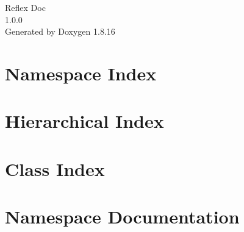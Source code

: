 \let\mypdfximage\pdfximage\def\pdfximage{\immediate\mypdfximage}\documentclass[twoside]{book}
\newcommand{\+}{\discretionary{\mbox{\scriptsize$\hookleftarrow$}}{}{}}
\newcommand{\clearemptydoublepage}{%
  \newpage{\pagestyle{empty}\cleardoublepage}%
}
\begin{document}
\hypersetup{pageanchor=false,
             bookmarksnumbered=true,
             pdfencoding=unicode
            }
\begin{titlepage}
\vspace*{7cm}
\begin{center}%
{\Large Reflex Doc \\[1ex]\large 1.\+0.\+0 }\\
\vspace*{1cm}
{\large Generated by Doxygen 1.8.16}\\
\end{center}
\end{titlepage}
\clearemptydoublepage
{}
\tableofcontents
\clearemptydoublepage
{}
\hypersetup{pageanchor=true}

\chapter{Namespace Index}

\chapter{Hierarchical Index}

\chapter{Class Index}

\chapter{Namespace Documentation}



\end{document}
